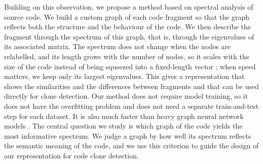 \documentclass[authoryear,final,5p,times,twocolumn]{elsarticle}
\theoremstyle{plain}
\begin{document}
Building on this observation, we propose a method based on spectral analysis
of source code. We build a custom graph of each code fragment so that the
graph reflects both the structure and the behaviour of the code. We then
describe the fragment through the spectrum of this graph, that is, through
the eigenvalues of its associated matrix. The spectrum does not change when
the nodes are relabelled, and its length grows with the number of nodes, so
it scales with the size of the code instead of being squeezed into a
fixed-length vector \cite{narayanan2017graph2vec,xu2019gin}; when speed
matters, we keep only its largest eigenvalues. This gives a representation that
shows the similarities and the differences between fragments and that can
be used directly for clone detection. Our method does not require model
training, so it does not have the overfitting problem and does not need a
separate train-and-test step for each dataset. It is also much faster than
heavy graph neural network models \cite{hamilton2017graphsage}. The central
question we study is which graph of the code yields the most informative
spectrum. We judge a graph by how well its spectrum reflects the semantic
meaning of the code, and we use this criterion to guide the design of our
representation for code clone detection.

\end{document}
